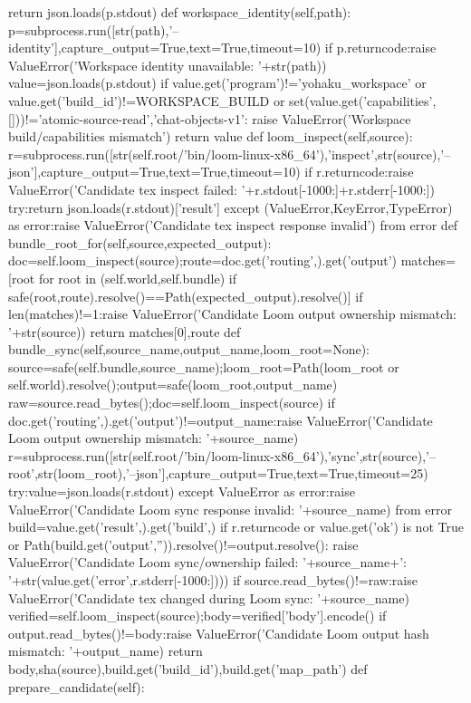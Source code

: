   return json.loads(p.stdout)
 def workspace_identity(self,path):
  p=subprocess.run([str(path),'--identity'],capture_output=True,text=True,timeout=10)
  if p.returncode:raise ValueError('Workspace identity unavailable: '+str(path))
  value=json.loads(p.stdout)
  if value.get('program')!='yohaku_workspace' or value.get('build_id')!=WORKSPACE_BUILD or set(value.get('capabilities',[]))!={'atomic-source-read','chat-objects-v1'}:
   raise ValueError('Workspace build/capabilities mismatch')
  return value
 def loom_inspect(self,source):
  r=subprocess.run([str(self.root/'bin/loom-linux-x86_64'),'inspect',str(source),'--json'],capture_output=True,text=True,timeout=10)
  if r.returncode:raise ValueError('Candidate tex inspect failed: '+r.stdout[-1000:]+r.stderr[-1000:])
  try:return json.loads(r.stdout)['result']
  except (ValueError,KeyError,TypeError) as error:raise ValueError('Candidate tex inspect response invalid') from error
 def bundle_root_for(self,source,expected_output):
  doc=self.loom_inspect(source);route=doc.get('routing',{}).get('output')
  matches=[root for root in (self.world,self.bundle) if safe(root,route).resolve()==Path(expected_output).resolve()]
  if len(matches)!=1:raise ValueError('Candidate Loom output ownership mismatch: '+str(source))
  return matches[0],route
 def bundle_sync(self,source_name,output_name,loom_root=None):
  source=safe(self.bundle,source_name);loom_root=Path(loom_root or self.world).resolve();output=safe(loom_root,output_name)
  raw=source.read_bytes();doc=self.loom_inspect(source)
  if doc.get('routing',{}).get('output')!=output_name:raise ValueError('Candidate Loom output ownership mismatch: '+source_name)
  r=subprocess.run([str(self.root/'bin/loom-linux-x86_64'),'sync',str(source),'--root',str(loom_root),'--json'],capture_output=True,text=True,timeout=25)
  try:value=json.loads(r.stdout)
  except ValueError as error:raise ValueError('Candidate Loom sync response invalid: '+source_name) from error
  build=value.get('result',{}).get('build',{})
  if r.returncode or value.get('ok') is not True or Path(build.get('output','')).resolve()!=output.resolve():
   raise ValueError('Candidate Loom sync/ownership failed: '+source_name+': '+str(value.get('error',r.stderr[-1000:])))
  if source.read_bytes()!=raw:raise ValueError('Candidate tex changed during Loom sync: '+source_name)
  verified=self.loom_inspect(source);body=verified['body'].encode()
  if output.read_bytes()!=body:raise ValueError('Candidate Loom output hash mismatch: '+output_name)
  return body,sha(source),build.get('build_id'),build.get('map_path')
 def prepare_candidate(self):
